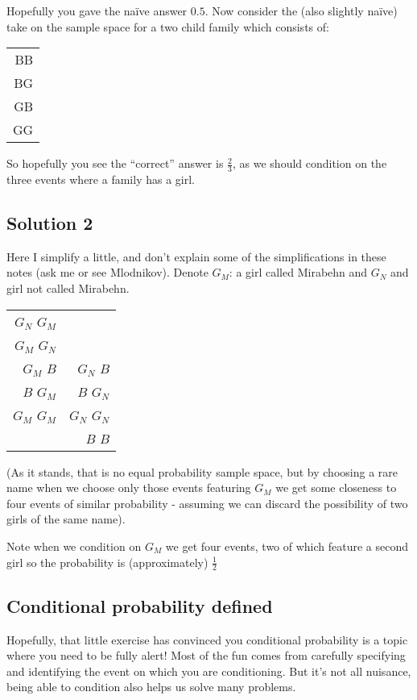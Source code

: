 \documentclass[12pt]{extbook}
\begin{document}
Hopefully you gave the na\"ive answer $0.5$.   Now consider the (also slightly na\"ive) take on the sample space for a two child family which consists of:

\begin{tabular}{r}
BB \\
{\color{red}BG} \\
{\color{red}GB}\\
{\color{red}GG}
\end{tabular}

So hopefully you see the ``correct'' answer is $\frac{2}{3}$, as we should condition on the three events where a family has a girl.

 

\subsection{Solution 2}

Here I simplify a little, and don't explain some of the simplifications in these notes (ask me or see Mlodnikov).   Denote $G_M$: a girl called Mirabehn and $G_N$ and girl not called Mirabehn.

\begin{tabular}{rr}
$G_N$ $G_M$ &  \\
$G_M$ $G_N$ &  \\
$G_M$ $B$   & $G_N$ $B$ \\
$B$ $G_M$  & $B$ $G_N$ \\
$G_M$ $G_M$ & $G_N$ $G_N$\\
 & $B$ $B$ \\
\end{tabular}

(As it stands, that is no equal probability sample space, but by choosing a rare name when we choose only those events featuring $G_M$ we get some closeness to four events of similar probability - assuming we can discard the possibility of two girls of the same name).   

Note when we condition on $G_M$ we get four events, two of which feature a second girl so the probability is (approximately) $\frac{1}{2}$

  

\subsection{Conditional probability defined}

Hopefully, that little exercise has convinced you conditional probability is a topic where you need to be fully alert!   Most of the fun comes from carefully specifying and identifying the event on which you are conditioning.   But it's not all nuisance, being able to condition also helps us solve many problems.
\end{document}
